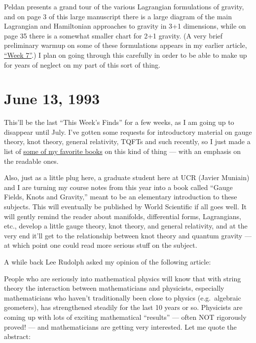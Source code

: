 \documentclass{article}
\def\tightlist{}
\renewcommand{\texttt}[1]{%
  \begingroup
  \ttfamily
  \begingroup\lccode`~=`/\lowercase{\endgroup\def~}{/\discretionary{}{}{}}%
  \begingroup\lccode`~=`[\lowercase{\endgroup\def~}{[\discretionary{}{}{}}%
  \begingroup\lccode`~=`.\lowercase{\endgroup\def~}{.\discretionary{}{}{}}%
  \catcode`/=\active\catcode`[=\active\catcode`.=\active
  \scantokens{#1\noexpand}%
  \endgroup
}
\begin{document}
Peldan presents a grand tour of the various Lagrangian formulations of
gravity, and on page 3 of this large manuscript there is a large diagram
of the main Lagrangian and Hamiltonian approaches to gravity in 3+1
dimensions, while on page 35 there is a somewhat smaller chart for 2+1
gravity. (A very brief preliminary warmup on some of these formulations
appears in my earlier article, \protect\hyperlink{week7}{``Week 7''}.) I
plan on going through this carefully in order to be able to make up for
years of neglect on my part of this sort of thing.
\hypertarget{week17}{%
\section{June 13, 1993}\label{week17}}

This'll be the last ``This Week's Finds'' for a few weeks, as I am going
up to disappear until July. I've gotten some requests for introductory
material on gauge theory, knot theory, general relativity, TQFTs and
such recently, so I just made a list of
\href{http://math.ucr.edu/home/baez/books.html}{some of my favorite
books} on this kind of thing --- with an emphasis on the readable ones.

Also, just as a little plug here, a graduate student here at UCR (Javier
Muniain) and I are turning my course notes from this year into a book
called ``Gauge Fields, Knots and Gravity,'' meant to be an elementary
introduction to these subjects. This will eventually be published by
World Scientific if all goes well. It will gently remind the reader
about manifolds, differential forms, Lagrangians, etc., develop a little
gauge theory, knot theory, and general relativity, and at the very end
it'll get to the relationship between knot theory and quantum gravity
--- at which point one could read more serious stuff on the subject.

A while back Lee Rudolph asked my opinion of the following article:


People who are seriously into mathematical physics will know that with
string theory the interaction between mathematicians and physicists,
especially mathematicians who haven't traditionally been close to
physics (e.g.~algebraic geometers), has strengthened steadily for the
last 10 years or so. Physicists are coming up with lots of exciting
mathematical ``results'' --- often NOT rigorously proved! --- and
mathematicians are getting very interested. Let me quote the abstract:
\end{document}
